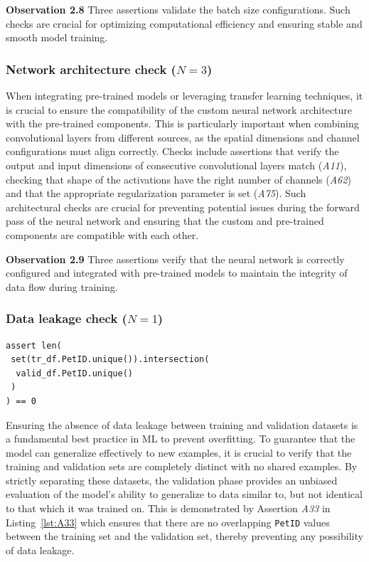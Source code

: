 \documentclass[journal]{IEEEtran}       %
\newcommand{\highlight}[1]{
  \begin{framed}%
    \noindent#1
\end{framed}}
\begin{document}
\highlight{\textbf{Observation 2.8} Three assertions validate the
  batch size configurations. Such checks are crucial for optimizing
computational efficiency and ensuring stable and smooth model training.}

\subsubsection{Network architecture check ($N = 3$)}

When integrating pre-trained models or leveraging transfer learning
techniques, it is crucial to ensure the compatibility of the custom
neural network architecture with the pre-trained components. This is
particularly important when combining convolutional layers from
different sources, as the spatial dimensions and channel
configurations must align correctly. Checks include assertions that
verify the output and input dimensions of consecutive convolutional
layers match (\emph{A11}), checking that shape of the activations
have the right number of channels (\emph{A62}) and that the
appropriate regularization parameter is set (\emph{A75}). Such
architectural checks are crucial for preventing potential issues
during the forward pass of the neural network and ensuring that the
custom and pre-trained components are compatible with each other.

\highlight{\textbf{Observation 2.9} Three assertions verify that the
  neural network is correctly configured and integrated with
pre-trained models to maintain the integrity of data flow during training.}

\subsubsection{Data leakage check ($N = 1$)}

\begin{lstlisting}[caption={Assertion \emph{A33} used to ensure that the training and validation sets do not contain any overlapping values.}, label={lst:A33}]
assert len(
 set(tr_df.PetID.unique()).intersection(
  valid_df.PetID.unique()
 )
) == 0
\end{lstlisting}

Ensuring the absence of data leakage between training and validation
datasets is a fundamental best practice in ML to prevent overfitting.
To guarantee that the model can generalize effectively to new
examples, it is crucial to verify that the training and validation
sets are completely distinct with no shared examples. By strictly
separating these datasets, the validation phase provides an unbiased
evaluation of the model's ability to generalize to data similar to,
but not identical to that which it was trained on. This is
demonstrated by Assertion \emph{A33} in Listing~\ref{lst:A33} which
ensures that there are no overlapping \lstinline{PetID} values
between the training set and the validation set, thereby preventing
any possibility of data leakage.
\end{document}
